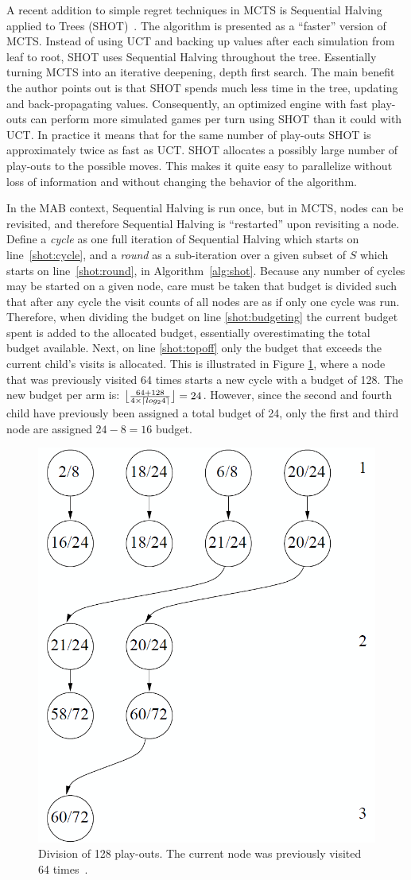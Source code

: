 \documentclass{kecsmstr}
\DeclarePairedDelimiter{\ceil}{\lceil}{\rceil}
\DeclarePairedDelimiter{\floor}{\lfloor}{\rfloor}
\begin{document}
A recent addition to simple regret techniques in MCTS is Sequential Halving applied to Trees (SHOT)~. The algorithm is presented as a ``faster'' version of MCTS. Instead of using UCT and backing up values after each simulation from leaf to root, SHOT uses Sequential Halving throughout the tree. Essentially turning MCTS into an iterative deepening, depth first search. The main benefit the author points out is that SHOT spends much less time in the tree, updating and back-propagating values. Consequently, an optimized engine with fast play-outs can perform more simulated games per turn using SHOT than it could with UCT. In practice it means that for the same number of play-outs SHOT is approximately twice as fast as UCT. SHOT allocates a
possibly large number of play-outs to the possible moves. This makes it quite easy to parallelize without loss of information and without changing the behavior of the algorithm.

In the MAB context, Sequential Halving is run once, but in MCTS, nodes can be revisited, and therefore Sequential Halving is ``restarted'' upon revisiting a node. Define a \emph{cycle} as one full iteration of Sequential Halving which starts on line~\ref{shot:cycle}, and a \emph{round} as a sub-iteration over a given subset of $S$ which starts on line~\ref{shot:round}, in Algorithm~\ref{alg:shot}. Because any number of cycles may be started on a given node, care must be taken that budget is divided such that after any cycle the visit counts of all nodes are as if only one cycle was run. Therefore, when dividing the budget on line \ref{shot:budgeting} the current budget spent is added to the allocated budget, essentially overestimating the total budget available. Next, on line \ref{shot:topoff} only the budget that exceeds the current child's visits is allocated. This is illustrated in Figure \ref{fig:shot-topoffs}, where a node that was previously visited 64 times starts a new cycle with a budget of 128. The new budget per arm is: $\floor[\big]{\frac{64 + 128}{4\times\ceil{log_2{4}}}} = 24$. However, since the second and fourth child have previously been assigned a total budget of 24, only the first and third node are assigned $24-8=16$ budget.

\begin{figure}[h]
	\centering
	\includegraphics[width=.4\textwidth]{img/shot_topoffs.png}
	\caption{Division of 128 play-outs. The current node was previously visited 64 times~\protect{}.}
	\label{fig:shot-topoffs}
\end{figure}
\end{document}
